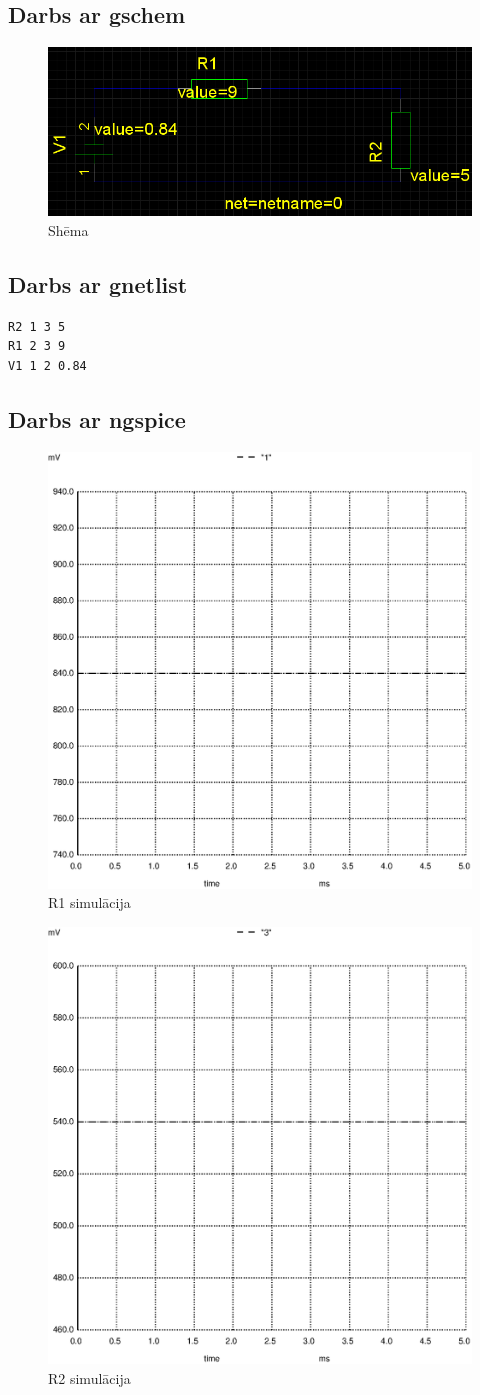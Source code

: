 \documentclass{report}
\begin{document}
\subsection{Darbs ar gschem}
\begin{figure}[h]
    \centering
    \includegraphics[width=0.5\linewidth]{schem.png}
    \caption{Shēma}
\end{figure}

\subsection{Darbs ar gnetlist}

\begin{verbatim}
R2 1 3 5
R1 2 3 9
V1 1 2 0.84
\end{verbatim}

\subsection{Darbs ar ngspice}

\begin{figure}[!h]
    \includegraphics[width=0.4\linewidth]{01.ps}
    \caption{R1 simulācija}
\end{figure}

\begin{figure}[!h]
    \includegraphics[width=0.4\linewidth]{03.ps}
    \caption{R2 simulācija}
\end{figure}
\end{document}
